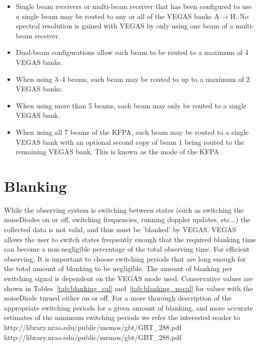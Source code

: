 \begin{itemize}[itemsep=0pt]
\item Single beam receivers or multi-beam receiver that has been configured to use
a single beam may be routed to any or all of the VEGAS banks A$\rightarrow$H.
No spectral resolution is gained with VEGAS by only using one beam of a multi-beam
receiver.
\item Dual-beam configurations allow each beam to be routed to a maximum of
4 VEGAS banks.
\item When using 3--4 beams, each beam may be routed to up to a maximum of
2 VEGAS banks.
\item When using more than 5 beams, each beam may only be routed to a
single VEGAS bank.
\item When using all 7 beams of the \gls{KFPA}, each beam may be routed to a single
VEGAS bank with an optional second copy of beam 1 being routed to the remaining
VEGAS bank. This is known as the  mode of the \gls{KFPA}
\end{itemize}

\section{Blanking}\label{sec:vegas_blanking}
While the observing system is switching between states (such as switching the 
\glspl{noiseDiode} on or off, switching frequencies, running doppler updates, etc...)
the collected data is not valid, and thus must be 'blanked' by VEGAS. VEGAS 
allows the user to switch states frequently enough that the required blanking 
time can become a non-negligible percentage of the total observing time. For
efficient observing, It is important to choose switching periods that are 
long enough for the total amount of blanking to be negligible. The amount of 
blanking per switching signal is dependent on the VEGAS mode used. Conservative
values are shown in Tables~\ref{tab:blanking_cal} and~\ref{tab:blanking_nocal}
for values with the \gls{noiseDiode} turned either on or off. For a more thorough
description of the appropriate switching periods for a given amount of blanking,
and more accurate estimates of the minimum switching periods we refer the
interested reader to
\htmladdnormallink
{http://library.nrao.edu/public/memos/gbt/GBT\_288.pdf}
{http://library.nrao.edu/public/memos/gbt/GBT_288.pdf}

\newpage

